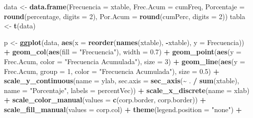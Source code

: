 \documentclass[
]{book}
\newenvironment{Shaded}{\begin{snugshade}}{\end{snugshade}}
\newcommand{\AttributeTok}[1]{\textcolor[rgb]{0.13,0.29,0.53}{#1}}
\newcommand{\DecValTok}[1]{\textcolor[rgb]{0.00,0.00,0.81}{#1}}
\newcommand{\FloatTok}[1]{\textcolor[rgb]{0.00,0.00,0.81}{#1}}
\newcommand{\FunctionTok}[1]{\textcolor[rgb]{0.13,0.29,0.53}{\textbf{#1}}}
\newcommand{\NormalTok}[1]{#1}
\newcommand{\OtherTok}[1]{\textcolor[rgb]{0.56,0.35,0.01}{#1}}
\newcommand{\SpecialCharTok}[1]{\textcolor[rgb]{0.81,0.36,0.00}{\textbf{#1}}}
\newcommand{\StringTok}[1]{\textcolor[rgb]{0.31,0.60,0.02}{#1}}
\begin{document}
\begin{Shaded}
\begin{Highlighting}[]
    
\NormalTok{    data }\OtherTok{\textless{}{-}} \FunctionTok{data.frame}\NormalTok{(}\AttributeTok{Frecuencia =}\NormalTok{ xtable,}
                       \AttributeTok{Frec.Acum =}\NormalTok{ cumFreq,}
                       \AttributeTok{Porcentaje =} \FunctionTok{round}\NormalTok{(percentage, }\AttributeTok{digits =} \DecValTok{2}\NormalTok{),}
                       \AttributeTok{Por.Acum =} \FunctionTok{round}\NormalTok{(cumPerc, }\AttributeTok{digits =} \DecValTok{2}\NormalTok{))}
\NormalTok{    tabla }\OtherTok{\textless{}{-}} \FunctionTok{t}\NormalTok{(data)}
    
\NormalTok{    p }\OtherTok{\textless{}{-}} \FunctionTok{ggplot}\NormalTok{(data, }\FunctionTok{aes}\NormalTok{(}\AttributeTok{x =} \FunctionTok{reorder}\NormalTok{(}\FunctionTok{names}\NormalTok{(xtable), }\SpecialCharTok{{-}}\NormalTok{xtable), }\AttributeTok{y =}\NormalTok{ Frecuencia)) }\SpecialCharTok{+}
      \FunctionTok{geom\_col}\NormalTok{(}\FunctionTok{aes}\NormalTok{(}\AttributeTok{fill =} \StringTok{"Frecuencia"}\NormalTok{), }\AttributeTok{width =} \FloatTok{0.7}\NormalTok{) }\SpecialCharTok{+}
      \FunctionTok{geom\_point}\NormalTok{(}\FunctionTok{aes}\NormalTok{(}\AttributeTok{y =}\NormalTok{ Frec.Acum, }\AttributeTok{color =} \StringTok{"Frecuencia Acumulada"}\NormalTok{), }\AttributeTok{size =} \DecValTok{3}\NormalTok{) }\SpecialCharTok{+}
      \FunctionTok{geom\_line}\NormalTok{(}\FunctionTok{aes}\NormalTok{(}\AttributeTok{y =}\NormalTok{ Frec.Acum, }\AttributeTok{group =} \DecValTok{1}\NormalTok{, }\AttributeTok{color =} \StringTok{"Frecuencia Acumulada"}\NormalTok{), }\AttributeTok{size =} \FloatTok{0.5}\NormalTok{) }\SpecialCharTok{+}
      \FunctionTok{scale\_y\_continuous}\NormalTok{(}\AttributeTok{name =}\NormalTok{ ylab,}
                         \AttributeTok{sec.axis =} \FunctionTok{sec\_axis}\NormalTok{(}\SpecialCharTok{\textasciitilde{}}\NormalTok{ . }\SpecialCharTok{/} \FunctionTok{sum}\NormalTok{(xtable),}
                                             \AttributeTok{name =} \StringTok{"Porcentaje"}\NormalTok{,}
                                             \AttributeTok{labels =}\NormalTok{ percentVec)) }\SpecialCharTok{+}
      \FunctionTok{scale\_x\_discrete}\NormalTok{(}\AttributeTok{name =}\NormalTok{ xlab) }\SpecialCharTok{+}
      \FunctionTok{scale\_color\_manual}\NormalTok{(}\AttributeTok{values =} \FunctionTok{c}\NormalTok{(corp.border, corp.border)) }\SpecialCharTok{+}
      \FunctionTok{scale\_fill\_manual}\NormalTok{(}\AttributeTok{values =}\NormalTok{ corp.col) }\SpecialCharTok{+} 
      \FunctionTok{theme}\NormalTok{(}\AttributeTok{legend.position =} \StringTok{"none"}\NormalTok{) }\SpecialCharTok{+}

\end{Highlighting}
\end{Shaded}
\end{document}
